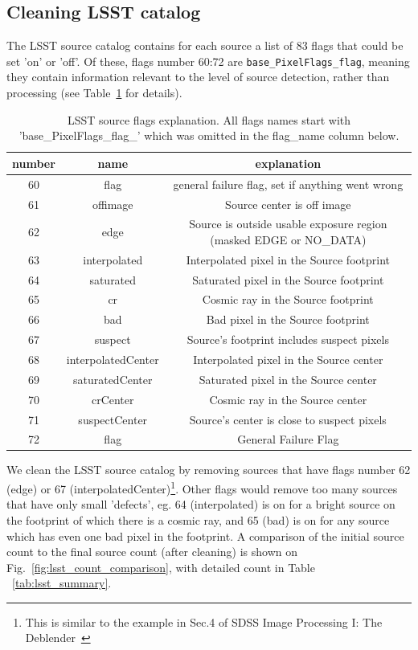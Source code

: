 \documentclass[DM,lsstdraft,toc,usenatbib]{lsstdoc}
\begin{document}
\subsection{Cleaning LSST catalog}
\label{sec:clean_lsst}
The LSST source catalog contains for each source a list of 83 flags that could be set 'on' or 'off'. Of these, flags number 60:72 are \verb|base_PixelFlags_flag|, meaning they contain information relevant to the level of source detection, rather than processing (see Table~\ref{tab:lsst_src_flags} for details).

\begin{table}
\centering
\caption{LSST source flags explanation. All flags names start with 'base\_PixelFlags\_flag\_' which was omitted in the flag\_name column below. }
\label{tab:lsst_src_flags}
\begin{tabular}{ccc}
\hline
number & name & explanation \\
\hline
60 & flag & general failure flag, set if anything went wrong \\
61 & offimage & Source center is off image \\
62 & edge & Source is outside usable exposure region (masked EDGE or NO\_DATA) \\
63 & interpolated & Interpolated pixel in the Source footprint \\
64 & saturated & Saturated pixel in the Source footprint \\
65 & cr & Cosmic ray in the Source footprint \\
66 & bad & Bad pixel in the Source footprint \\
67 & suspect & Source's footprint includes suspect pixels \\
68 & interpolatedCenter & Interpolated pixel in the Source center \\
69 & saturatedCenter & Saturated pixel in the Source center \\
70 & crCenter & Cosmic ray in the Source center \\
71 & suspectCenter & Source's center is close to suspect pixels \\
72 & flag & General Failure Flag \\
\hline
\end{tabular}
\end{table}

We clean the LSST source catalog by removing sources that have flags number 62 (edge) or 67 (interpolatedCenter)\footnote{This is similar to the example in Sec.4 of SDSS Image Processing I: The Deblender~\citep{lupton2005}}. Other flags would remove too many sources that have only small 'defects', eg. 64 (interpolated) is on for a bright source on the footprint of which there is a cosmic ray, and 65 (bad) is on for any source which has even one bad pixel in the footprint. A comparison of the initial source count to the final source count (after cleaning) is shown on Fig.~\ref{fig:lsst_count_comparison}, with detailed count in  Table ~\ref{tab:lsst_summary}.
\end{document}
